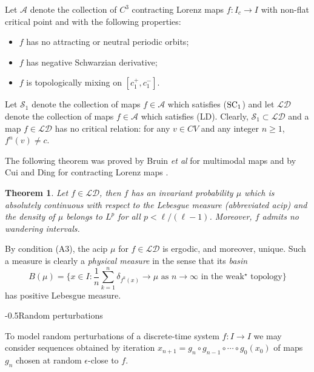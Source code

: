 \documentclass[11pt,oneside]{article}
\makeatletter
\theoremstyle{plain}
\newtheorem{thm}{Theorem}
\numberwithin{equation}{section}
\numberwithin{figure}{section}
\numberwithin{table}{section}
\renewcommand{\subsection}{\@startsection{subsection}{1}{0mm}
{-\baselineskip}{0.5\baselineskip}{\large\bf\leftline}}
\makeatother
\begin{document}
Let $\mathcal A$ denote the collection of $C^3$ contracting Lorenz maps $f : I_c \to I$ with non-flat critical point and with the following properties:
\begin{itemize}
\item[(A1)] $f$ has no attracting or neutral periodic orbits;
\item[(A2)] $f$ has negative Schwarzian derivative;
\item[(A3)] $f$ is topologically mixing on $[c_1^+, c_1^-]$. 
\end{itemize}
Let $\mathcal S_1$ denote the collection of maps $f \in \mathcal A$ which satisfies (${\rm SC_1}$) and let $\mathcal {LD}$ denote the collection of maps $f \in \mathcal A$ which satisfies (LD). Clearly, $\mathcal S_1 \subset \mathcal{LD}$ and a map $f \in \mathcal{LD}$ has no critical relation: for any $v \in CV$ and any integer $n \geq 1$, $f^n(v) \neq c$. 


The following theorem was proved by Bruin {\it et al} for multimodal maps \cite{BRSS} and by Cui and Ding for contracting Lorenz maps \cite{CD}. 


\begin{thm}\cite{CD}
Let $f \in \mathcal{LD}$, then $f$ has an invariant probability $\mu$ which is absolutely continuous with respect to the Lebesgue measure (abbreviated acip) and the density of $\mu$ belongs to $L^p$ for all $p < \ell/(\ell-1)$. Moreover, $f$ admits no wandering intervals. 
\end{thm}


By condition (A3), the acip $\mu$ for $f \in \mathcal {LD}$  is ergodic, and moreover, unique. Such a measure is clearly a {\it physical measure} in the sense that its {\it basin}
\begin{equation}
B(\mu)= \{ x \in I :  \frac{1}{n} \sum_{k=1}^n \delta_{f^k(x)} \to \mu \mbox{ as } n \to \infty \mbox{ in the weak$^{\star}$ topology} \}
\end{equation}
has positive Lebesgue measure. 



\subsection{Random perturbations}


To model random perturbations of a discrete-time system $f : I \to I$ we may consider sequences obtained by iteration $x_{n+1} = g_n \circ g_{n-1} \circ \cdots \circ g_0(x_0)$ of maps $g_n$ chosen at random $\epsilon$-close to $f$. 
\end{document}
